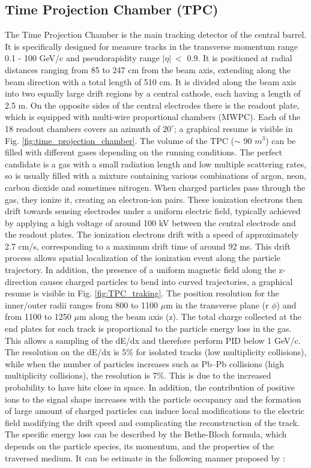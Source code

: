 \documentclass[12pt,a4paper]{book}
\begin{document}
	\subsection{Time Projection Chamber (TPC)}
	The Time Projection Chamber is the main tracking detector of the central barrel. It is specifically designed for measure tracks in the transverse momentum range 0.1 - 100 GeV/c and pseudorapidity range $|\eta| \ <$ 0.9.  It is positioned at radial distances ranging from 85 to 247 cm from the beam axis, extending along the beam direction with a total length of 510 cm. It is divided along the beam axis into two equally large drift regions by a central cathode, each having a length of 2.5 m. On the opposite sides of the central electrodes there is the readout plate, which is equipped with multi-wire proportional chambers (MWPC). Each of the 18 readout chambers covers an azimuth of $20^{\circ}$; a graphical resume is visible in Fig. \ref{fig:time_projection_chamber}. The volume of the TPC ($\sim$ 90 $m^3$) can be filled with different gases depending on the running conditions. The perfect candidate is a gas with a small radiation length and low multiple scattering rates, so is usually filled with a mixture containing various combinations of argon, neon, carbon dioxide and sometimes nitrogen. When charged particles pass through the gas, they ionize it, creating an electron-ion pairs. These ionization electrons then drift towards sensing electrodes under a uniform electric field, typically achieved by applying a high voltage of around 100 kV between the central electrode and the readout plates. The ionization electrons drift with a speed of approximately 2.7 cm/s, corresponding to a maximum drift time of around 92 ms. This drift process allows spatial localization of the ionization event along the particle trajectory. In addition, the presence of a uniform magnetic field along the z-direction causes charged particles to bend into curved trajectories, a graphical resume is visible in Fig. \ref{fig:TPC_traking}. The position resolution for the inner/outer radii ranges from 800 to 1100 $\mu$m in the transverse plane (r $\phi$) and from 1100 to 1250 $\mu$m along the beam axis (z). The total charge collected at the end plates for each track is proportional to the particle energy loss in the gas. This allows a sampling of the dE/dx and therefore perform PID below 1 GeV/c. The resolution on the dE/dx is 5\% for isolated tracks (low multiplicity collisions), while when the number of particles increases such as Pb–Pb collisions (high multiplicity collisions), the resolution is 7\%. This is due to the increased probability to have hits close in space. In addition, the contribution of positive ions to the signal shape increases with the particle occupancy and the formation of large amount of charged particles can induce local modifications to the electric field modifying the drift speed and complicating the reconstruction of the track. The specific energy loss can be described by the Bethe-Bloch formula, which depends on the particle species, its momentum, and the properties of the traversed medium. It can be estimate in the following manner proposed by \cite{Rolandi:2008ujz}:
\end{document}
